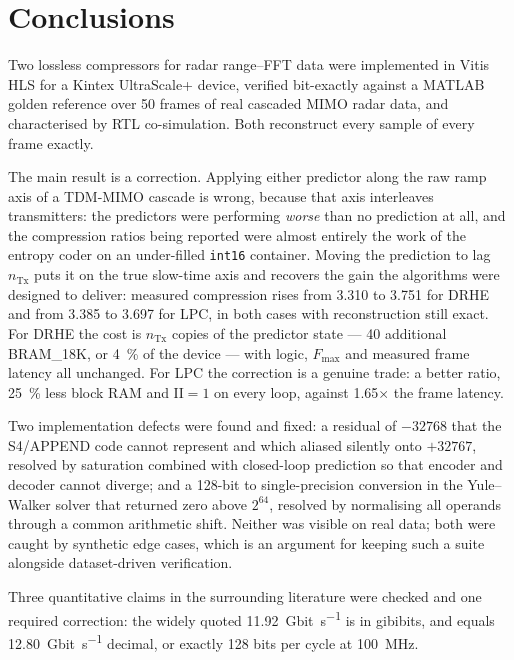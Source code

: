 \documentclass[10pt,twocolumn]{article}
\begin{document}
\section{Conclusions}
\label{sec:conclusion}

Two lossless compressors for radar range--FFT data were implemented in Vitis
HLS for a Kintex UltraScale+ device, verified bit-exactly against a MATLAB
golden reference over 50 frames of real cascaded MIMO radar data, and
characterised by RTL co-simulation. Both reconstruct every sample of every
frame exactly.

The main result is a correction. Applying either predictor along the raw ramp
axis of a TDM-MIMO cascade is wrong, because that axis interleaves
transmitters: the predictors were performing \emph{worse} than no prediction at
all, and the compression ratios being reported were almost entirely the work of
the entropy coder on an under-filled \texttt{int16} container. Moving the
prediction to lag $n_{\mathrm{Tx}}$ puts it on the true slow-time axis and
recovers the gain the algorithms were designed to deliver: measured compression
rises from \num{3.310} to \num{3.751} for DRHE and from \num{3.385} to
\num{3.697} for LPC, in both cases with reconstruction still exact. For DRHE
the cost is $n_{\mathrm{Tx}}$ copies of the predictor state --- \num{40}
additional BRAM\_18K, or \SI{4}{\percent} of the device --- with logic,
$F_{\max}$ and measured frame latency all unchanged. For LPC the correction is
a genuine trade: a better ratio, \SI{25}{\percent} less block RAM and
$\mathrm{II}=1$ on every loop, against \num{1.65}$\times$ the frame latency.

Two implementation defects were found and fixed: a residual of $-32768$ that
the S4/APPEND code cannot represent and which aliased silently onto $+32767$,
resolved by saturation combined with closed-loop prediction so that encoder and
decoder cannot diverge; and a 128-bit to single-precision conversion in the
Yule--Walker solver that returned zero above $2^{64}$, resolved by normalising
all operands through a common arithmetic shift. Neither was visible on real
data; both were caught by synthetic edge cases, which is an argument for
keeping such a suite alongside dataset-driven verification.

Three quantitative claims in the surrounding literature were checked and one
required correction: the widely quoted \SI{11.92}{Gbit\per\second} is in
gibibits, and equals \SI{12.80}{Gbit\per\second} decimal, or exactly
\num{128} bits per cycle at \SI{100}{\mega\hertz}.
\end{document}
